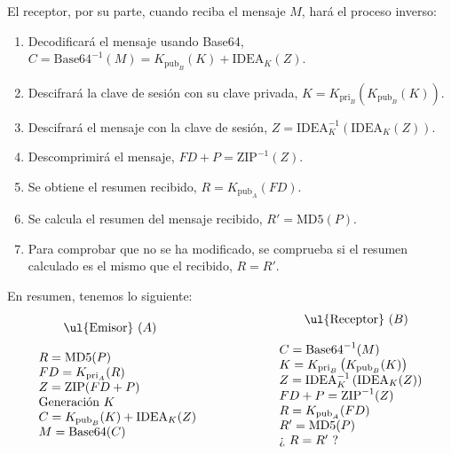 El receptor, por su parte, cuando reciba el mensaje $M$, hará el proceso inverso:
\begin{enumerate}
    \item Decodificará el mensaje usando Base64, $C=\text{Base64}^{-1}(M)=K_{\text{pub}_B}(K)+\text{IDEA}_K(Z)$.
    \item Descifrará la clave de sesión con su clave privada, $K=K_{\text{pri}_B}\left(K_{\text{pub}_B}(K)\right)$.
    \item Descifrará el mensaje con la clave de sesión, $Z=\text{IDEA}^{-1}_K\left(\text{IDEA}_K(Z)\right)$.
    \item Descomprimirá el mensaje, $FD+P=\text{ZIP}^{-1}(Z)$.
    \item Se obtiene el resumen recibido, $R=K_{\text{pub}_A}(FD)$.
    \item Se calcula el resumen del mensaje recibido, $R'=\text{MD5}(P)$.
    \item Para comprobar que no se ha modificado, se comprueba si el resumen calculado es el mismo que el recibido, $R=R'$.
\end{enumerate}

En resumen, tenemos lo siguiente:
\begin{equation*}
    \begin{array}{l}
        \qquad \text{\ul{Emisor}}\ (A)\\\\
        R = \text{MD5}(P)\\
        FD = K_{\text{pri}_A}(R)\\
        Z = \text{ZIP}(FD+P)\\
        \text{Generación}\ K \\
        C = K_{\text{pub}_B}(K)+\text{IDEA}_K(Z)\\
        M = \text{Base64}(C)
    \end{array}
    \hspace{2cm}
    \begin{array}{l}
        \qquad \text{\ul{Receptor}}\ (B)\\\\
        C = \text{Base64}^{-1}(M)\\
        K = K_{\text{pri}_B}\left(K_{\text{pub}_B}(K)\right)\\
        Z = \text{IDEA}^{-1}_K\left(\text{IDEA}_K(Z)\right)\\
        FD+P = \text{ZIP}^{-1}(Z)\\
        R = K_{\text{pub}_A}(FD)\\
        R' = \text{MD5}(P)\\
        \text{¿}\ R = R'\ \text{?}
    \end{array}
\end{equation*}

